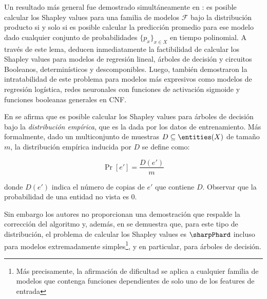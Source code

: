 Un resultado más general fue demostrado simultáneamente en \cite{van2022tractability}: es posible calcular los Shapley values para una familia de modelos \(\mathcal{F}\) bajo la distribución producto si y solo si es posible calcular la predicción promedio para ese modelo dado cualquier conjunto de probabilidades \(\{p_x\}_{x \in X}\) en tiempo polinomial. A través de este lema, deducen inmediatamente la factibilidad de calcular los Shapley values para modelos de regresión lineal, árboles de decisión y circuitos Booleanos, determinísticos y descomponibles. Luego, también demostraron la intratabilidad de este problema para modelos más expresivos como modelos de regresión logística, redes neuronales con funciones de activación sigmoide y funciones booleanas generales en CNF.

En \cite{lundberg2020local} se afirma que es posible calcular los Shapley values para árboles de decisión bajo la \textit{distribución empírica}, que es la dada por los datos de entrenamiento. Más formalmente, dado un multiconjunto de muestras \(D \subseteq \entities(X)\) de tamaño \(m\), la distribución empírica inducida por \(D\) se define como:

\[
\Pr[e'] = \frac{D(e')}{m} 
\]

donde \(D(e')\) indica el número de copias de \(e'\) que contiene \(D\). Observar que la probabilidad de una entidad no vista es 0.

Sin embargo los autores no proporcionan una demostración que respalde la corrección del algoritmo y, además, en \cite{van2022tractability} se demuestra que, para este tipo de distribución, el problema de calcular los Shapley values es \(\sharpPhard\) incluso para modelos extremadamente simples\footnote{Más precisamente, la afirmación de dificultad se aplica a cualquier familia de modelos que contenga funciones dependientes de solo uno de los features de entrada}, y en particular, para árboles de decisión.

